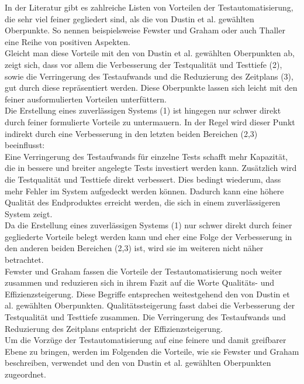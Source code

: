 In der Literatur gibt es zahlreiche Listen von Vorteilen der Testautomatisierung, die sehr viel feiner gegliedert sind, als die von Dustin et al. \cite[S.44 ff.]{dustin_software_2001} gewählten Oberpunkte.
So nennen beispielsweise Fewster und Graham \cite[vgl. S.9 ff.]{fewster_software_1999} oder auch Thaller \cite[vgl. S.28 ff.]{thaller_software-test_2002} eine Reihe von positiven Aspekten.\\
Gleicht man diese Vorteile mit den von Dustin et al. gewählten Oberpunkten ab, zeigt sich, dass vor allem die Verbesserung der Testqualität und Testtiefe (2), sowie die Verringerung des Testaufwands und die Reduzierung des Zeitplans (3), gut durch diese repräsentiert werden. Diese Oberpunkte lassen sich leicht mit den feiner ausformulierten Vorteilen unterfüttern.\\ Die Erstellung eines zuverlässigen Systems (1) ist hingegen nur schwer direkt durch feiner formulierte Vorteile zu untermauern. In der Regel wird dieser Punkt indirekt durch eine Verbesserung in den letzten beiden Bereichen (2,3) beeinflusst:\\
Eine Verringerung des Testaufwands für einzelne Tests schafft mehr Kapazität, die in bessere und breiter angelegte Tests investiert werden kann. Zusätzlich wird die Testqualität und Testtiefe direkt verbessert. Dies bedingt wiederum, dass mehr Fehler im System aufgedeckt werden können. Dadurch kann eine höhere Qualität des Endproduktes erreicht werden, die sich in einem zuverlässigeren System zeigt.\\
Da die Erstellung eines zuverlässigen Systems (1) nur schwer direkt durch feiner gegliederte Vorteile belegt werden kann und eher eine Folge der Verbesserung in den anderen beiden Bereichen (2,3) ist, wird sie im weiteren nicht näher betrachtet.\\
Fewster und Graham \cite[vgl. S.10]{fewster_software_1999} fassen die Vorteile der Testautomatisierung noch weiter zusammen und reduzieren sich in ihrem Fazit auf die Worte \grq Qualitäts- und Effizienzsteigerung\grq.
Diese Begriffe entsprechen weitestgehend den von Dustin et al. gewählten Oberpunkten. Qualitätssteigerung fasst dabei die Verbesserung der Testqualität und Testtiefe zusammen. Die Verringerung des Testaufwands und Reduzierung des Zeitplans entspricht der Effizienzsteigerung.\\
Um die Vorzüge der Testautomatisierung auf eine feinere und damit greifbarer Ebene zu bringen, werden im Folgenden die Vorteile, wie sie 
Fewster und Graham beschreiben, verwendet und den von Dustin et al. gewählten Oberpunkten zugeordnet.

